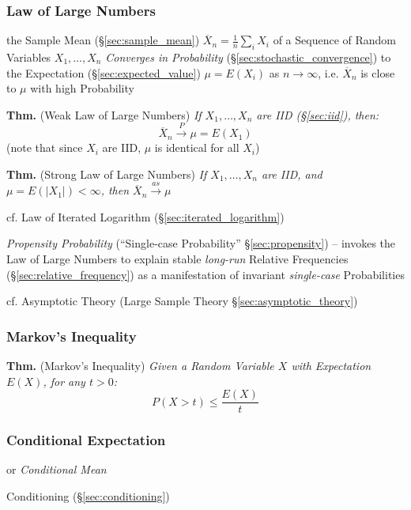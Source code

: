 \subsubsection{Law of Large Numbers}\label{sec:large_numbers}

the Sample Mean (\S\ref{sec:sample_mean})
$\overline{X}_n = \frac{1}{n}\sum_i X_i$ of a Sequence of Random Variables
$X_1, \ldots, X_n$ \emph{Converges in Probability}
(\S\ref{sec:stochastic_convergence}) to the Expectation
(\S\ref{sec:expected_value}) $\mu = E(X_i)$ as $n \to \infty$, i.e.
$\overline{X}_n$ is close to $\mu$ with high Probability

\textbf{Thm.} (Weak Law of Large Numbers) \emph{If $X_1, \ldots, X_n$ are IID
  (\S\ref{sec:iid}), then:
  \[
    \overline{X}_n \xrightarrow{P} \mu = E(X_1)
  \]
}
(note that since $X_i$ are IID, $\mu$ is identical for all $X_i$)

\textbf{Thm.} (Strong Law of Large Numbers) \emph{If $X_1, \ldots, X_n$ are IID,
  and $\mu = E(|X_1|) < \infty$, then $\overline{X}_n \xrightarrow{as} \mu$}

\fist cf. Law of Iterated Logarithm (\S\ref{sec:iterated_logarithm})

\fist \emph{Propensity Probability} (``Single-case Probability''
\S\ref{sec:propensity}) -- invokes the Law of Large Numbers to explain stable
\emph{long-run} Relative Frequencies (\S\ref{sec:relative_frequency}) as a
manifestation of invariant \emph{single-case} Probabilities

\fist cf. Asymptotic Theory (Large Sample Theory \S\ref{sec:asymptotic_theory})



\subsubsection{Markov's Inequality}\label{sec:markovs_inequality}

\textbf{Thm.} (Markov's Inequality) \emph{
  Given a Random Variable $X$ with Expectation $E(X)$, for any $t > 0$:
  \[
    P(X > t) \leq \frac{E(X)}{t}
  \]
}



\subsubsection{Conditional Expectation}\label{sec:conditional_expectation}

or \emph{Conditional Mean}

\fist Conditioning (\S\ref{sec:conditioning})

